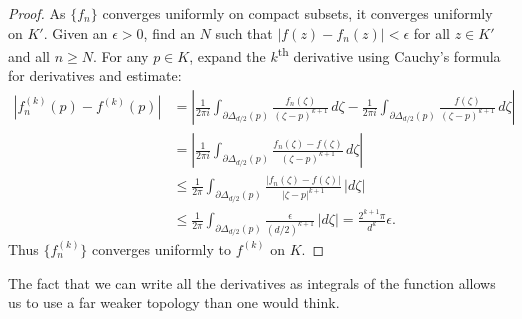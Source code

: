 \documentclass[12pt,openany]{book}
\newcommand{\sabs}[1]{\lvert {#1} \rvert}
\newcommand{\abs}[1]{\left\lvert {#1} \right\rvert}
\theoremstyle{plain}
\theoremstyle{remark}
\theoremstyle{definition}
\theoremstyle{exercise}
\theoremstyle{example}
\begin{document}
\begin{proof}
As $\{ f_n \}$ converges uniformly on compact subsets, it converges uniformly
on $K'$.  Given an $\epsilon > 0$, find an $N$ such that 
$\sabs{f(z)-f_n(z)} < \epsilon$ for all $z \in K'$ and
all $n \geq N$.
For any $p \in K$, expand the $k$\textsuperscript{th} derivative
using Cauchy's formula for derivatives and estimate:
\begin{equation*}
\begin{split}
\abs{
f_n^{(k)}(p)
-
f^{(k)}(p)
}
& =
\abs{
\frac{1}{2\pi i}
\int_{\partial \Delta_{d/2}(p)}
\frac{f_n(\zeta)}{{(\zeta-p)}^{k+1}} \, d\zeta 
-
\frac{1}{2\pi i}
\int_{\partial \Delta_{d/2}(p)}
\frac{f(\zeta)}{{(\zeta-p)}^{k+1}} \, d\zeta 
}
\\
& =
\abs{
\frac{1}{2\pi i}
\int_{\partial \Delta_{d/2}(p)}
\frac{f_n(\zeta)-f(\zeta)}{{(\zeta-p)}^{k+1}} \, d\zeta 
}
\\
& \leq
\frac{1}{2\pi}
\int_{\partial \Delta_{d/2}(p)}
\frac{\sabs{f_n(\zeta)-f(\zeta)}}{{\sabs{\zeta-p}}^{k+1}} \, \sabs{d\zeta}
\\
&
\leq
\frac{1}{2\pi}
\int_{\partial \Delta_{d/2}(p)}
\frac{\epsilon}{{(d/2)}^{k+1}} \, \sabs{d\zeta}
=
\frac{2^{k+1}\pi}{d^k} 
\epsilon .
\end{split}
\end{equation*}
Thus $\bigl\{ f_n^{(k)} \bigr\}$ converges uniformly to $f^{(k)}$ on $K$.
\end{proof}

The fact that we can write all the derivatives as
integrals of the function
allows us to use a far weaker topology than one would think.
\end{document}
